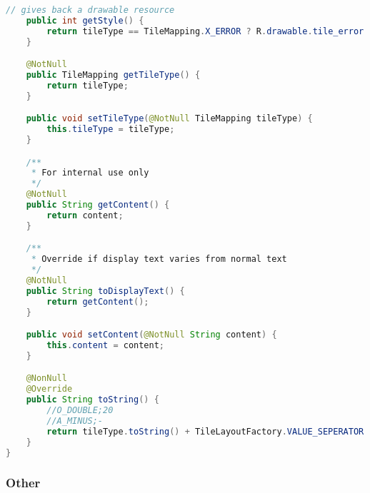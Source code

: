 \begin{lstlisting}[caption=TileScheme,label=list:TileScheme,language=Java]
    // gives back a drawable resource
    public int getStyle() {
        return tileType == TileMapping.X_ERROR ? R.drawable.tile_error : tileType.getType().getStyle();
    }

    @NotNull
    public TileMapping getTileType() {
        return tileType;
    }

    public void setTileType(@NotNull TileMapping tileType) {
        this.tileType = tileType;
    }

    /**
     * For internal use only
     */
    @NotNull
    public String getContent() {
        return content;
    }

    /**
     * Override if display text varies from normal text
     */
    @NotNull
    public String toDisplayText() {
        return getContent();
    }

    public void setContent(@NotNull String content) {
        this.content = content;
    }

    @NonNull
    @Override
    public String toString() {
        //O_DOUBLE;20
        //A_MINUS;-
        return tileType.toString() + TileLayoutFactory.VALUE_SEPERATOR + this.getContent();
    }
}
\end{lstlisting}

\subsubsection{Other}

